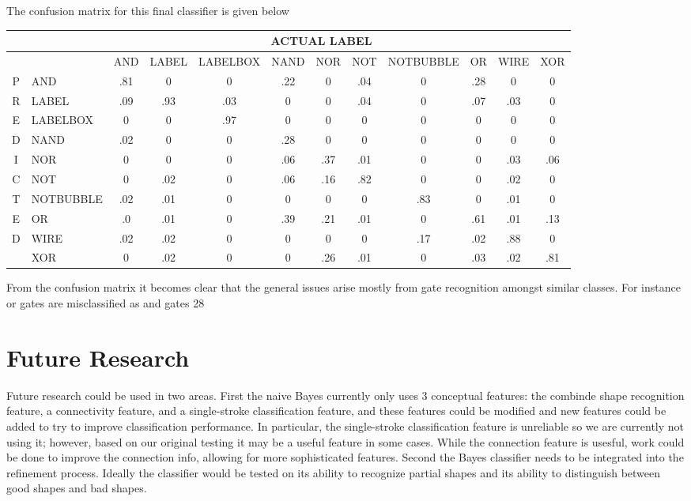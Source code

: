 \documentclass{article}
\begin{document}
The confusion matrix for this final classifier is given below


\begin{tabular}{|c|l|c|c|c|c|c|c|c|c|c|c|}
\hline
&&\multicolumn{9}{c}{ACTUAL LABEL}\\
\hline
&&\tiny{AND}&\tiny{LABEL}&\tiny{LABELBOX}&\tiny{NAND}&\tiny{NOR}&\tiny{NOT}&\tiny{NOTBUBBLE}&\tiny{OR}&\tiny{WIRE}&\tiny{XOR}\\
\hline
P&\tiny{AND}&.81&0&0&.22&0&.04&0&.28&0&0\\
R&\tiny{LABEL}&.09&.93&.03&0&0&.04&0&.07&.03&0\\
E&\tiny{LABELBOX}&0&0&.97&0&0&0&0&0&0&0\\
D&\tiny{NAND}&.02&0&0&.28&0&0&0&0&0&0\\
I&\tiny{NOR}&0&0&0&.06&.37&.01&0&0&.03&.06\\
C&\tiny{NOT}&0&.02&0&.06&.16&.82&0&0&.02&0\\
T&\tiny{NOTBUBBLE}&.02&.01&0&0&0&0&.83&0&.01&0\\
E&\tiny{OR}&.0&.01&0&.39&.21&.01&0&.61&.01&.13\\
D&\tiny{WIRE}&.02&.02&0&0&0&0&.17&.02&.88&0\\
&\tiny{XOR}&0&.02&0&0&.26&.01&0&.03&.02&.81\\
\hline
\end{tabular}
\newline

From the confusion matrix it becomes clear that the general issues arise mostly from gate recognition amongst similar classes.  For instance or gates are misclassified as and gates 28%

\section{Future Research}
Future research could be used in two areas.  First the naive Bayes currently only uses 3 conceptual features: the combinde shape recognition feature, a connectivity feature, and a single-stroke classification feature, and these features could be modified and new features could be added to try to improve classification performance.  In particular, the single-stroke classification feature is unreliable so we are currently not using it; however, based on our original testing it may be a useful feature in some cases. While the connection feature is usesful, work could be done to improve the connection info, allowing for more sophisticated features.   Second the Bayes classifier needs to be integrated into the refinement process.  Ideally the classifier would be tested on its ability to recognize partial shapes and its ability to distinguish between good shapes and bad shapes.  
\end{document}
